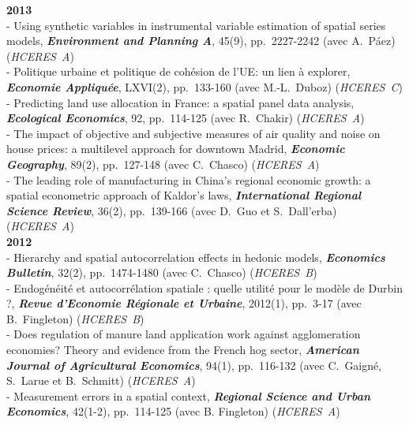 \documentclass[a4paper,12pt]{article}
\begin{document}
\noindent \textbf{2013}  \smallskip \\ 
- Using synthetic variables in instrumental variable estimation of spatial series models, \textit{\textbf{Environment and Planning A}}, 45(9), pp.~2227-2242 (avec A.~Páez) (\textit{HCERES~A}) \\
- Politique urbaine et politique de cohésion de l'UE: un lien à explorer, \textit{\textbf{Economie Appliquée}}, LXVI(2), pp.~133-160 (avec M.-L.~Duboz) (\textit{HCERES~C}) \\
- Predicting land use allocation in France: a spatial panel data analysis, \textit{\textbf{Ecological Economics}}, 92, pp.~114-125 (avec R.~Chakir) (\textit{HCERES~A}) \\
- The impact of objective and subjective measures of air quality and noise on house prices: a multilevel approach for downtown Madrid, \textit{\textbf{Economic Geography}}, 89(2), pp.~127-148 (avec C.~Chasco) (\textit{HCERES~A}) \\
- The leading role of manufacturing in China's regional economic growth: a spatial econometric approach of Kaldor's laws, \textit{\textbf{International Regional Science Review}}, 36(2), pp.~139-166 (avec D.~Guo et S.~Dall'erba) (\textit{HCERES~A}) \\

\noindent \textbf{2012}  \smallskip \\ 
- Hierarchy and spatial autocorrelation effects in hedonic models, \textit{\textbf{Economics Bulletin}}, 32(2), pp.~1474-1480 (avec C.~Chasco) (\textit{HCERES~B}) \\
 - Endogénéité et autocorrélation spatiale : quelle utilité pour le modèle de Durbin ?, \textit{\textbf{Revue d'Economie Régionale et Urbaine}}, 2012(1), pp.~3-17 (avec B.~Fingleton) (\textit{HCERES~B}) \\
 - Does regulation of manure land application work against agglomeration economies? Theory and evidence from the French hog sector, \textit{\textbf{American Journal of Agricultural Economics}}, 94(1), pp.~116-132 (avec C.~Gaigné, S.~Larue et B.~Schmitt) (\textit{HCERES~A}) \\
 - Measurement errors in a spatial context, \textit{\textbf{Regional Science and Urban Economics}}, 42(1-2), pp.~114-125 (avec B. Fingleton) (\textit{HCERES~A}) \\
 
\end{document}
